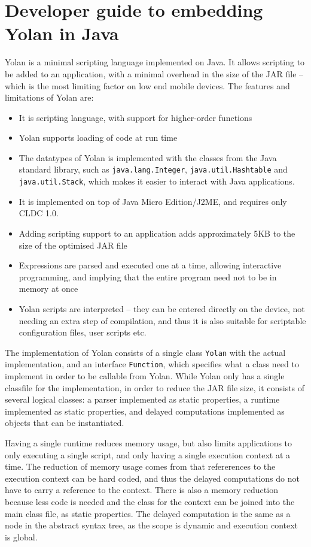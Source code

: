 \documentclass[11pt]{report}
\begin{document}
\section{Developer guide to embedding Yolan in Java}
Yolan is a minimal scripting language implemented on Java.
It allows scripting to be added to an application, with a minimal overhead in the size of the JAR file -- which is the most limiting factor on low end mobile devices. The features and limitations of Yolan are:
\begin{itemize}
\item It is scripting language, with support for higher-order functions
\item Yolan supports loading of code at run time
\item The datatypes of Yolan is implemented with the classes from the Java standard library, such as \verb|java.lang.Integer|, \verb|java.util.Hashtable| and \verb|java.util.Stack|, which makes it easier to interact with Java applications.
\item It is implemented on top of Java Micro Edition/J2ME, and requires only CLDC 1.0.
\item Adding scripting support to an application adds approximately 5KB to the size of the optimised JAR file
\item Expressions are parsed and executed one at a time, allowing interactive programming, and implying that the entire program need not to be in memory at once
\item Yolan scripts are interpreted -- they can be entered directly on the device, not needing an extra step of compilation, and thus it is also suitable for scriptable configuration files, user scripts etc.
\end{itemize}

The implementation of Yolan consists of a single class \verb|Yolan| with the actual implementation, and an interface \verb|Function|, which specifies what a class need to implement in order to be callable from Yolan.
While Yolan only has a single classfile for the implementation, in order to reduce the JAR file size, it consists of several logical classes: a parser implemented as static properties, a runtime implemented as static properties, and delayed computations implemented as objects that can be instantiated.

Having a single runtime reduces memory usage, but also limits applications to only executing a single script, and only having a single execution context at a time. The reduction of memory usage comes from that refererences to the execution context can be hard coded, and thus the delayed computations do not have to carry a reference to the context. There is also a memory reduction because less code is needed and the class for the context can be joined into the main class file, as static properties.
The delayed computation is the same as a node in the abstract syntax tree, as the scope is dynamic and execution context is global. 
\end{document}
